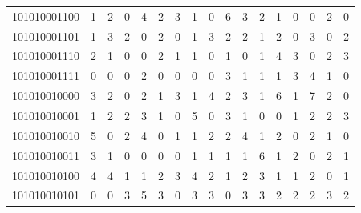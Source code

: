 \documentclass[10pt,a4paper]{article}
\begin{document}
\begin{longtable}{ |c|c|c|c|c|c|c|c|c|c|c|c|c|c|c|c|c| }
    101010001100              & 1                            & 2                                & 0                            & 4                              & 2   & 3   & 1   & 0   & 6   & 3   & 2   & 1   & 0   & 0   & 2   & 0   \\
    101010001101              & 1                            & 3                                & 2                            & 0                              & 2   & 0   & 1   & 3   & 2   & 2   & 1   & 2   & 0   & 3   & 0   & 2   \\
    101010001110              & 2                            & 1                                & 0                            & 0                              & 2   & 1   & 1   & 0   & 1   & 0   & 1   & 4   & 3   & 0   & 2   & 3   \\
    101010001111              & 0                            & 0                                & 0                            & 2                              & 0   & 0   & 0   & 0   & 3   & 1   & 1   & 1   & 3   & 4   & 1   & 0   \\
    101010010000              & 3                            & 2                                & 0                            & 2                              & 1   & 3   & 1   & 4   & 2   & 3   & 1   & 6   & 1   & 7   & 2   & 0   \\
    101010010001              & 1                            & 2                                & 2                            & 3                              & 1   & 0   & 5   & 0   & 3   & 1   & 0   & 0   & 1   & 2   & 2   & 3   \\
    101010010010              & 5                            & 0                                & 2                            & 4                              & 0   & 1   & 1   & 2   & 2   & 4   & 1   & 2   & 0   & 2   & 1   & 0   \\
    101010010011              & 3                            & 1                                & 0                            & 0                              & 0   & 0   & 1   & 1   & 1   & 1   & 6   & 1   & 2   & 0   & 2   & 1   \\
    101010010100              & 4                            & 4                                & 1                            & 1                              & 2   & 3   & 4   & 2   & 1   & 2   & 3   & 1   & 1   & 2   & 0   & 1   \\
    101010010101              & 0                            & 0                                & 3                            & 5                              & 3   & 0   & 3   & 3   & 0   & 3   & 3   & 2   & 2   & 2   & 3   & 2   \\

\end{longtable}
\end{document}

